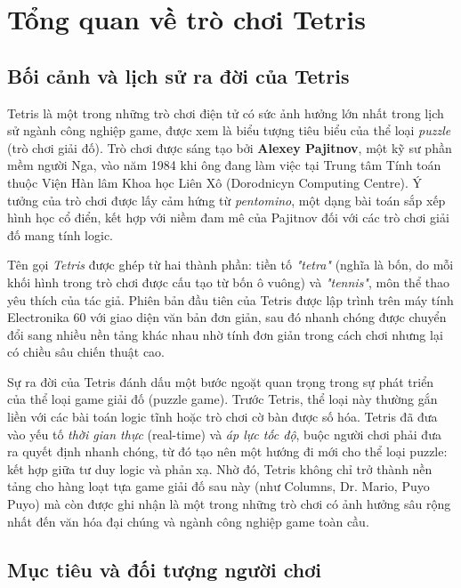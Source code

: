 \section{Tổng quan về trò chơi Tetris}

\subsection{Bối cảnh và lịch sử ra đời của Tetris}
\label{subsec:boi-canh-lich-su}

Tetris là một trong những trò chơi điện tử có sức ảnh hưởng lớn nhất trong lịch sử ngành công nghiệp game, được xem là biểu tượng tiêu biểu của thể loại \textit{puzzle} (trò chơi giải đố). Trò chơi được sáng tạo bởi \textbf{Alexey Pajitnov}, một kỹ sư phần mềm người Nga, vào năm 1984 khi ông đang làm việc tại Trung tâm Tính toán thuộc Viện Hàn lâm Khoa học Liên Xô (Dorodnicyn Computing Centre). Ý tưởng của trò chơi được lấy cảm hứng từ \textit{pentomino}, một dạng bài toán sắp xếp hình học cổ điển, kết hợp với niềm đam mê của Pajitnov đối với các trò chơi giải đố mang tính logic.

Tên gọi \textit{Tetris} được ghép từ hai thành phần: tiền tố \textit{"tetra"} (nghĩa là bốn, do mỗi khối hình trong trò chơi được cấu tạo từ bốn ô vuông) và \textit{"tennis"}, môn thể thao yêu thích của tác giả. Phiên bản đầu tiên của Tetris được lập trình trên máy tính Electronika 60 với giao diện văn bản đơn giản, sau đó nhanh chóng được chuyển đổi sang nhiều nền tảng khác nhau nhờ tính đơn giản trong cách chơi nhưng lại có chiều sâu chiến thuật cao.

Sự ra đời của Tetris đánh dấu một bước ngoặt quan trọng trong sự phát triển của thể loại game giải đố (puzzle game). Trước Tetris, thể loại này thường gắn liền với các bài toán logic tĩnh hoặc trò chơi cờ bàn được số hóa. Tetris đã đưa vào yếu tố \textit{thời gian thực} (real-time) và \textit{áp lực tốc độ}, buộc người chơi phải đưa ra quyết định nhanh chóng, từ đó tạo nên một hướng đi mới cho thể loại puzzle: kết hợp giữa tư duy logic và phản xạ. Nhờ đó, Tetris không chỉ trở thành nền tảng cho hàng loạt tựa game giải đố sau này (như Columns, Dr. Mario, Puyo Puyo) mà còn được ghi nhận là một trong những trò chơi có ảnh hưởng sâu rộng nhất đến văn hóa đại chúng và ngành công nghiệp game toàn cầu.

\subsection{Mục tiêu và đối tượng người chơi}

